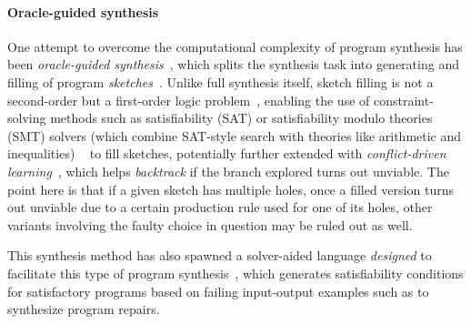 \documentclass{article}
\begin{document}


\paragraph{Oracle-guided synthesis}

One attempt to overcome the computational complexity of program synthesis
has been \emph{oracle-guided synthesis}~\citep{solar2008program},
which splits the synthesis task into generating and filling of program
\emph{sketches}~\citep{murali2017neural}.
Unlike full synthesis itself, sketch filling is not a second-order but a
first-order logic problem~\citep{gulwani2017program}, enabling the use of constraint-solving methods
such as satisfiability (SAT) or satisfiability modulo theories (SMT) solvers
(which combine SAT-style search with theories like arithmetic and inequalities)%
~\citep{akiba2013calibrating,alur2013syntax,alur2016sygus,rosette,architecture}
to fill sketches, potentially further extended with
\emph{conflict-driven learning}~\citep{feng2018program,hornclauses},
which helps \emph{backtrack} if the branch explored turns out unviable.
The point here is that if a given sketch has multiple holes,
once a filled version turns out unviable due to a certain production rule used for one of its holes,
other variants involving the faulty choice in question may be ruled out as well.

This synthesis method has also spawned a solver-aided language
\emph{designed} to facilitate this type of program synthesis~\citep{rosette},
which generates satisfiability conditions for satisfactory programs
based on failing input-output examples such as to synthesize program repairs.
\end{document}
